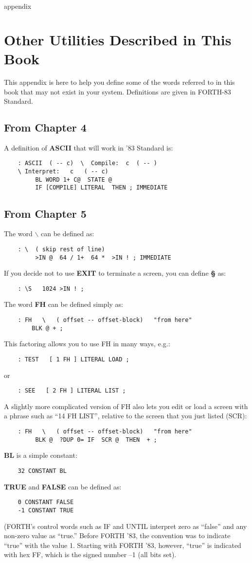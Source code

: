 appendix{}
\chapter{
Other Utilities
Described
in This Book
}
This appendix is here to help you define some of the words referred to in 
this book that may not exist in your system.  Definitions are given in
FORTH-83 Standard.
\section{From Chapter 4}
A definition of {\bf ASCII} that will work in '83 Standard is:
\begin{verbatim}
    : ASCII  ( -- c)  \  Compile:  c  ( -- )
    \ Interpret:   c   ( -- c)
         BL WORD 1+ C@  STATE @
         IF [COMPILE] LITERAL  THEN ; IMMEDIATE
\end{verbatim}
\section{From Chapter 5}
The word {\bf $\backslash$} can be defined as:
\begin{verbatim}
    : \  ( skip rest of line)
         >IN @  64 / 1+  64 *  >IN ! ; IMMEDIATE
\end{verbatim}
If you decide not to use {\bf EXIT} to terminate a screen, you can define {\bf \S}
as:
\begin{verbatim}
    : \S   1024 >IN ! ;
\end{verbatim}
The word {\bf FH} can be defined simply as:
\begin{verbatim}
    : FH   \   ( offset -- offset-block)   "from here"
        BLK @ + ;
\end{verbatim}
This factoring allows you to use FH in many ways, e.g.:
\begin{verbatim}
    : TEST   [ 1 FH ] LITERAL LOAD ;
\end{verbatim}
or
\begin{verbatim}
    : SEE   [ 2 FH ] LITERAL LIST ;
\end{verbatim}
A slightly more complicated version of FH also lets you edit or load a 
screen with a phrase such as ``14 FH LIST'', relative to the screen that 
you just listed (SCR):
\begin{verbatim}
    : FH   \   ( offset -- offset-block)   "from here"
         BLK @  ?DUP 0= IF  SCR @  THEN  + ;
\end{verbatim}
{\bf BL} is a simple constant:
\begin{verbatim}
    32 CONSTANT BL
\end{verbatim}
{\bf TRUE} and {\bf FALSE} can be defined as:
\begin{verbatim}
    0 CONSTANT FALSE
    -1 CONSTANT TRUE
\end{verbatim}
(FORTH's control words such as IF and UNTIL interpret zero as ``false'' 
and any non-zero value as ``true.''  Before FORTH '83, the convention
was to indicate ``true'' with the value 1.  Starting with FORTH '83,
however, ``true'' is indicated with hex FF, which is the signed number --1
(all bits set).

